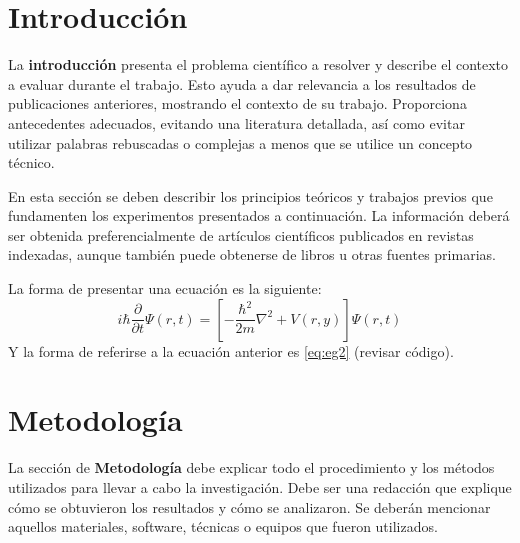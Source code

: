 \documentclass[11pt,letterpaper,twocolumn]{article}
\begin{document}
\section{Introducción}
\justify
La \textbf{introducción} presenta el problema científico a resolver y describe el contexto a evaluar durante el trabajo. Esto ayuda a dar relevancia a los resultados de publicaciones anteriores, mostrando el contexto de su trabajo. Proporciona antecedentes adecuados, evitando una literatura detallada, así como evitar utilizar palabras rebuscadas o complejas a menos que se utilice un
concepto técnico.\par \vspace{5mm}  %
En esta sección se deben describir los principios teóricos y trabajos previos que fundamenten los experimentos presentados a continuación. La información deberá ser obtenida preferencialmente de artículos científicos publicados en revistas indexadas, aunque también puede obtenerse de libros u otras fuentes primarias.\par \vspace{5mm}
La forma de presentar una ecuación es la siguiente: 
\begin{equation}
    \label{eq:eg2}
    i \hbar \frac{\partial}{\partial t} \Psi (r,t)= \left[ -\frac{\hbar^{2}}{2m} \nabla^{2} +V(r,y)\right] \Psi (r,t)
\end{equation}
Y la forma de referirse a la ecuación anterior es \ref{eq:eg2} (revisar código).
\section{Metodología}
\justify
La sección de \textbf{Metodología} debe explicar todo el procedimiento y los métodos utilizados para llevar a cabo la investigación. Debe ser una redacción que explique cómo se obtuvieron los resultados y cómo se analizaron. Se deberán mencionar aquellos materiales, software, técnicas o equipos que fueron utilizados.
\end{document}
